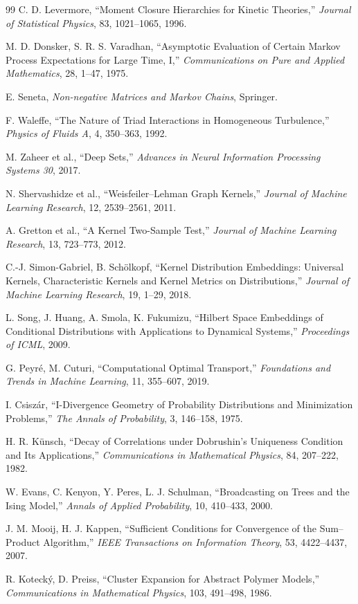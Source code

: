 \documentclass[11pt,a4paper,openany]{book}
\numberwithin{equation}{chapter}
\begin{document}
\begin{thebibliography}{99}
C. D. Levermore,
``Moment Closure Hierarchies for Kinetic Theories,''
\emph{Journal of Statistical Physics}, 83, 1021--1065, 1996.

M. D. Donsker, S. R. S. Varadhan,
``Asymptotic Evaluation of Certain Markov Process Expectations for Large Time, I,''
\emph{Communications on Pure and Applied Mathematics}, 28, 1--47, 1975.

E. Seneta,
\emph{Non-negative Matrices and Markov Chains},
Springer.

F. Waleffe,
``The Nature of Triad Interactions in Homogeneous Turbulence,''
\emph{Physics of Fluids A}, 4, 350--363, 1992.

M. Zaheer et al.,
``Deep Sets,''
\emph{Advances in Neural Information Processing Systems 30}, 2017.

N. Shervashidze et al.,
``Weisfeiler--Lehman Graph Kernels,''
\emph{Journal of Machine Learning Research}, 12, 2539--2561, 2011.

A. Gretton et al.,
``A Kernel Two-Sample Test,''
\emph{Journal of Machine Learning Research}, 13, 723--773, 2012.

C.-J. Simon-Gabriel, B. Sch\"olkopf,
``Kernel Distribution Embeddings: Universal Kernels, Characteristic Kernels and Kernel Metrics on Distributions,''
\emph{Journal of Machine Learning Research}, 19, 1--29, 2018.

L. Song, J. Huang, A. Smola, K. Fukumizu,
``Hilbert Space Embeddings of Conditional Distributions with Applications to Dynamical Systems,''
\emph{Proceedings of ICML}, 2009.

G. Peyr\'e, M. Cuturi,
``Computational Optimal Transport,''
\emph{Foundations and Trends in Machine Learning}, 11, 355--607, 2019.

I. Csisz\'ar,
``I-Divergence Geometry of Probability Distributions and Minimization Problems,''
\emph{The Annals of Probability}, 3, 146--158, 1975.

H. R. K\"unsch,
``Decay of Correlations under Dobrushin's Uniqueness Condition and Its Applications,''
\emph{Communications in Mathematical Physics}, 84, 207--222, 1982.

W. Evans, C. Kenyon, Y. Peres, L. J. Schulman,
``Broadcasting on Trees and the Ising Model,''
\emph{Annals of Applied Probability}, 10, 410--433, 2000.

J. M. Mooij, H. J. Kappen,
``Sufficient Conditions for Convergence of the Sum--Product Algorithm,''
\emph{IEEE Transactions on Information Theory}, 53, 4422--4437, 2007.

R. Koteck\'y, D. Preiss,
``Cluster Expansion for Abstract Polymer Models,''
\emph{Communications in Mathematical Physics}, 103, 491--498, 1986.

\end{thebibliography}
\endgroup
\end{document}
